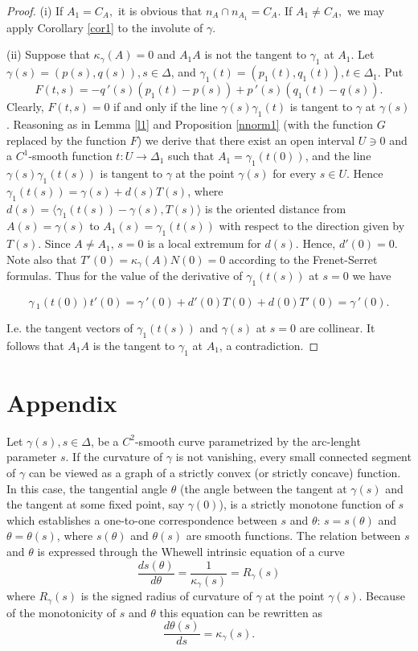 \documentclass[a4paper,12pt]{amsart}
\def\g{\gamma}
\begin{document}
\begin{proof} (i) If $A_1=C_A,$ it is obvious that $n_A \cap
n_{A_1}=C_A$. If $A_1\neq C_A,$ we may apply Corollary \ref{cor1}
to the involute of $\g$.

(ii) Suppose that $\kappa_{\g}(A)=0$ and
$A_1A$ is not the tangent to $\g_1$ at $A_1$.
Let $\g(s)=(p(s), q(s)), s \in \Delta$, and
$\g_1(t)=(p_1(t), q_1(t)), t\in \Delta_1$. Put
$$F(t,s) = -q\,'(s)(p_1(t) - p(s)) + p\,'(s)(q_1(t) - q(s)).$$
\noindent Clearly, $F(t,s)=0$ if and only if the line $\g(s)\g_1(t)$ is tangent to  $\g$ at $\g(s)$.
Reasoning as in Lemma \ref{l1} and Proposition
\ref{nnorm1} (with the function $G$ replaced by the function $F$) we derive that there exist an open interval $U \ni 0$ and a
$C^1$-smooth function $t: U \rightarrow \Delta_1$ such that $A_1=\g_1(t(0))$, and the line
$\g(s)\g_1(t(s))$ is tangent to $\g$ at the point
$\g(s)$ for every $s\in U$. Hence
$\g_1(t(s))= \g(s)+ d(s)T(s)$, where
$d(s)=\langle \g_1(t(s)) - \g(s), T(s)\rangle$ is the oriented distance from $A(s)=\g(s)$
to $A_1(s)=\g_1(t(s))$ with respect to the direction given by $T(s)$.
Since $A\neq A_1$, $s=0$ is a local extremum for $d(s)$. Hence, $d'(0)=0$. Note also that
$T'(0)=\kappa_{\g}(A)N(0)=0$ according to the Frenet-Serret formulas. Thus for the value of the derivative of $\g_1(t(s))$ at  $s=0$ we have

$$\g\,_1(t(0)) t'(0) =
\g\,'(0)+d'(0)T(0)+d(0)T'(0)=\g\,'(0).$$

\noindent I.e. the tangent vectors of $\g_1(t(s))$ and $\g(s)$  at $s=0$ are collinear. It follows that $A_1A$ is the tangent to $\g_1$
at $A_1$, a contradiction.
\end{proof}

\section{Appendix}


Let $\g(s), s\in \Delta$,  be a $C^2$-smooth curve parametrized by the arc-lenght parameter $s$.
If the curvature of $\g$ is not vanishing, every small connected segment of $\g$ can be viewed as a graph of a strictly convex (or strictly concave) function.
In this case, the tangential angle $\theta$ (the angle between the tangent at $\g(s)$ and the tangent at some fixed point, say $\g(0)$), is a strictly monotone function of $s$ which establishes a one-to-one correspondence between $s$ and $\theta$: $s=s(\theta)$ and $\theta = \theta(s)$, where $s(\theta)$ and $\theta(s)$ are smooth functions. The relation between $s$ and
$\theta$ is expressed through the Whewell intrinsic equation of a curve
\cite{WW}
$$\frac{ds(\theta)}{d\theta} =
\frac{1}{\kappa_{\g}(s)}= R_{\g}(s)$$
\noindent where $R_{\g}(s)$ is the signed radius of curvature of $\g$ at the point $\g(s)$.
Because of the monotonicity of $s$ and $\theta$ this equation can be rewritten  as
$$\frac{d\theta(s)}{ds} = \kappa_{\g}(s).$$
\end{document}
